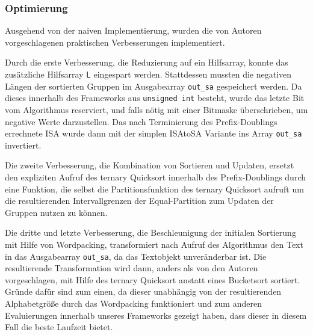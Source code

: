 \subsubsection{Optimierung}
Ausgehend von der naiven Implementierung, wurden die von Autoren vorgeschlagenen praktischen Verbesserungen implementiert. 

Durch die erste Verbesserung, die Reduzierung auf ein Hilfsarray, konnte das zusätzliche Hilfsarray $\mathsf{L}$ eingespart werden. Stattdessen mussten die negativen Längen der sortierten Gruppen im Ausgabearray \texttt{out_sa} gespeichert werden. Da dieses innerhalb des Frameworks aus \texttt{unsigned int} besteht, wurde das letzte Bit vom Algorithmus reserviert, und falls nötig mit einer Bitmaske überschrieben, um \glqq negative\grqq{} Werte darzustellen. Das nach Terminierung des Prefix-Doublings errechnete ISA wurde dann mit der simplen ISAtoSA Variante ins Array \texttt{out_sa} invertiert. 

Die zweite Verbesserung, die Kombination von Sortieren und Updaten, ersetzt den expliziten Aufruf des ternary Quicksort innerhalb des Prefix-Doublings durch eine Funktion, die selbst die Partitionsfunktion des ternary Quicksort aufruft um die resultierenden Intervallgrenzen der Equal-Partition zum Updaten der Gruppen nutzen zu können.

Die dritte und letzte Verbesserung, die Beschleunigung der initialen Sortierung mit Hilfe von Wordpacking, transformiert nach Aufruf des Algorithmus den Text in das Ausgabearray \texttt{out_sa}, da das Textobjekt unveränderbar ist. Die resultierende Transformation wird dann, anders als von den Autoren vorgeschlagen, mit Hilfe des ternary Quicksort anstatt eines Bucketsort sortiert. Gründe dafür sind zum einen, da dieser unabhängig von der resultierenden Alphabetgröße durch das Wordpacking funktioniert und zum anderen Evaluierungen innerhalb unseres Frameworks gezeigt haben, dass dieser in diesem Fall die beste Laufzeit bietet.
